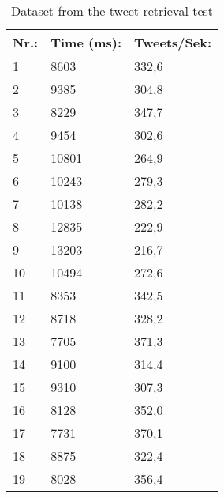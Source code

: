 \begin{table}[H]\centering
\begin{tabular}{|l|l|l|}\hline
\textbf{Nr.:}	&	\textbf{Time (ms):}	&	\textbf{Tweets/Sek:} \\\hline
1	&	8603	&	332,6	\\\hline
2	&	9385	&	304,8	\\\hline
3	&	8229	&	347,7	\\\hline
4	&	9454	&	302,6	\\\hline
5	&	10801	&	264,9	\\\hline
6	&	10243	&	279,3	\\\hline
7	&	10138	&	282,2	\\\hline
8	&	12835	&	222,9	\\\hline
9	&	13203	&	216,7	\\\hline
10	&	10494	&	272,6	\\\hline
11	&	8353	&	342,5	\\\hline
12	&	8718	&	328,2	\\\hline
13	&	7705	&	371,3	\\\hline
14	&	9100	&	314,4	\\\hline
15	&	9310	&	307,3	\\\hline
16	&	8128	&	352,0	\\\hline
17	&	7731	&	370,1	\\\hline
18	&	8875	&	322,4	\\\hline
19	&	8028	&	356,4	\\\hline
\end{tabular}
\caption{Dataset from the tweet retrieval test}
\label{tab:tweetRet}
\end{table}



































